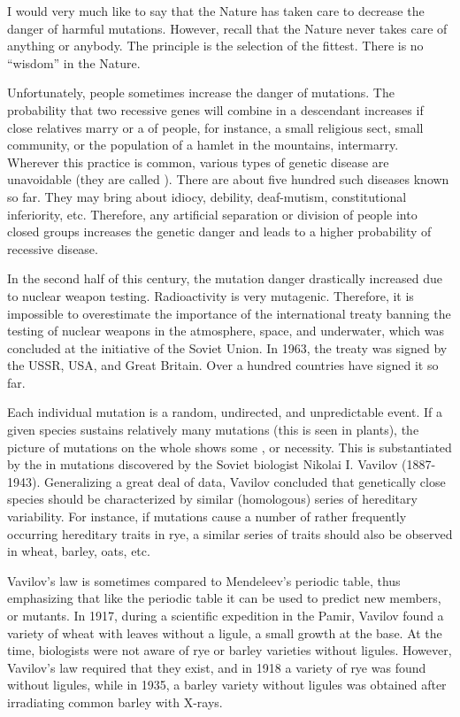 I would very much like to say that the Nature has taken care to
decrease the danger of harmful mutations. However, recall that the
Nature never takes care of anything or anybody. The principle is the
selection of the fittest. There is no ``wisdom'' in the Nature.

Unfortunately, people sometimes increase the danger of mutations.
The probability that two recessive genes will combine in a descendant
increases if close relatives marry or a  of people, for instance, a small religious sect, small community, or the population of a hamlet in the mountains, intermarry. Wherever this practice is common, various types of genetic disease are unavoidable (they are called ). There are about five hundred such diseases known so far. They may bring about idiocy, debility, deaf-mutism, constitutional inferiority, etc. Therefore, any artificial separation or division of people into closed groups increases the genetic danger and leads to a higher probability of recessive disease.

In the second half of this century, the mutation danger drastically
increased due to nuclear weapon testing. Radioactivity is very mutagenic.
Therefore, it is impossible to overestimate the importance of the
international treaty banning the testing of nuclear weapons in the
atmosphere, space, and underwater, which was concluded at the
initiative of the Soviet Union. In 1963, the treaty was signed by the
USSR, USA, and Great Britain. Over a hundred countries have signed it
so far.

 Each
individual mutation is a random, undirected, and unpredictable event. If
a given species sustains relatively many mutations (this is seen in plants),
the picture of mutations on the whole shows some , or
necessity. This is substantiated by the  in
mutations discovered by the Soviet biologist Nikolai I. Vavilov
(1887-1943). Generalizing a great deal of data, Vavilov concluded that
genetically close species should be characterized by similar (homologous)
series of hereditary variability. For instance, if mutations cause
a number of rather frequently occurring hereditary traits in rye,
a similar series of traits should also be observed in wheat, barley, oats,
etc.

Vavilov's law is sometimes compared to Mendeleev's periodic table,
thus emphasizing that like the periodic table it can be used to predict
new members, or mutants. In 1917, during a scientific expedition in the
Pamir, Vavilov found a variety of wheat with leaves without a ligule,
a small growth at the base. At the time, biologists were not aware of rye
or barley varieties without ligules. However, Vavilov's law required that
they exist, and in 1918 a variety of rye was found without ligules, while
in 1935, a barley variety without ligules was obtained after irradiating
common barley with X-rays.

